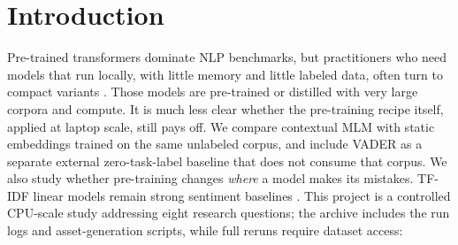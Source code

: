 \documentclass[11pt,a4paper]{article}
\begin{document}
\begin{abstract}
Our negative result applies to the tested small corpus (1.2\,M words), short CPU training schedule, tokenizer, and fine-tuning recipe; it should not be generalized to pre-training in general.
(vi) Extending the study to two more domains -- Financial PhraseBank (finance news, real annotator-agreement tiers) and Twitter Airline Sentiment (social media, real crowd-worker confidence) -- confirms the pattern: fastText has a 3.2-point higher accuracy estimate than MLM pre-training at $n{=}100$ on airline (descriptive; the new paired-bootstrap script has not yet been run to regenerate its interval), and the full-data point estimates are close in the two new in-domain tasks, unlike SST-2 where TF-IDF keeps a clear accuracy edge. The paired-bootstrap script has been added but not run to regenerate finance/airline full-data intervals, so we do not claim statistical indistinguishability. Cross-domain transfer varies sharply by direction; TF-IDF trained on SST-2 reaches 62.7\% accuracy on finance, compared with 51.8--54.1\% for the tiny transformers.
\end{abstract}

\section{Introduction}
Pre-trained transformers \cite{devlin2019bert} dominate NLP benchmarks, but practitioners who need models that run locally, with little memory and little labeled data, often turn to compact variants
\cite{turc2019well,sanh2019distilbert,jiao2020tinybert,wang2020minilm}. Those models are pre-trained or distilled with very large corpora and compute. It is much less clear whether the pre-training recipe itself,
applied at laptop scale, still pays off. We compare contextual MLM with static embeddings trained on the same unlabeled corpus, and include VADER as a separate external zero-task-label baseline that does not consume that corpus. We also study whether pre-training changes \emph{where} a model makes its mistakes.
TF-IDF linear models remain strong sentiment baselines \cite{wang2012baselines}. This project is a controlled CPU-scale study addressing eight research questions; the archive includes the run logs and asset-generation scripts, while full reruns require dataset access:
\end{document}
